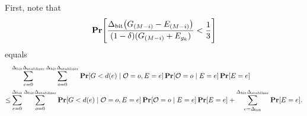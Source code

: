 \newcommand{\OverCountRV}{\mathcal{O}}
\newcommand{\orderpinner}{\DegBit\DegStable - \DegStable e, p_S, i, \frac{(3\DegBit + 1 - \delta) e}{3\DegBit -1 + \delta}}
\newcommand{\desiredGPrimeUpperBoundExp}{\frac{(3 \DegBit + 1 - \delta) e}{3 \DegBit - 1 + \delta}}
\newcommand{\desiredGPrimeUpperBound}{d(e)}
\newcommand{\generatorscoreRVGivenE}{G^e}

 
First, note that
$$
	\Pr\mleft[\OptVarEq < \frac{1}{3}\mright]
$$
equals
\begin{align*}
	&\sum_{e = 0}^{\DegBit\DegStable} 
	\sum_{o = 0}^{\DegBit \DegStable} 
			\Pr\mleft[\genscoreRVCorrected < \desiredGPrimeUpperBound \mid \OverCountRV = o , \lyingGenerator = e\mright]
			\Pr\mleft[\OverCountRV = o \mid \lyingGenerator = e\mright]
			\Pr\mleft[\lyingGenerator = e\mright]\\
\leq
	&\sum_{e = 0}^{\DegBit} 
	\sum_{o = 0}^{\DegBit \DegStable} 
			\Pr\mleft[\genscoreRVCorrected < \desiredGPrimeUpperBound \mid \OverCountRV = o , \lyingGenerator = e\mright]
			\Pr\mleft[\OverCountRV = o \mid \lyingGenerator = e\mright]
			\Pr\mleft[\lyingGenerator = e\mright]
			+ \sum_{e = \DegBit}^{\DegBit\DegStable}\Pr[\lyingGenerator = e].
\end{align*}







